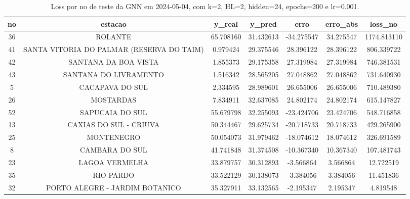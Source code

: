 \begin{table}[h]
\centering
\caption{Loss por no de teste da GNN em 2024-05-04, com k=2, HL=2, hidden=24, epochs=200 e lr=0.001.}
\label{tab:gnn_loss_k2_hl2_h24_e200_d20240504}
\begin{tabular}{ccccccc}
\toprule
no & estacao & y\_real & y\_pred & erro & erro\_abs & loss\_no \\
\midrule
36 & ROLANTE & 65.708160 & 31.432613 & -34.275547 & 34.275547 & 1174.813110 \\
41 & SANTA VITORIA DO PALMAR (RESERVA DO TAIM) & 0.979424 & 29.375546 & 28.396122 & 28.396122 & 806.339722 \\
42 & SANTANA DA BOA VISTA & 1.855373 & 29.175358 & 27.319984 & 27.319984 & 746.381531 \\
43 & SANTANA DO LIVRAMENTO & 1.516342 & 28.565205 & 27.048862 & 27.048862 & 731.640930 \\
5 & CACAPAVA DO SUL & 2.334595 & 28.989601 & 26.655006 & 26.655006 & 710.489380 \\
26 & MOSTARDAS & 7.834911 & 32.637085 & 24.802174 & 24.802174 & 615.147827 \\
52 & SAPUCAIA DO SUL & 55.679798 & 32.255093 & -23.424706 & 23.424706 & 548.716858 \\
13 & CAXIAS DO SUL - CRIUVA & 50.344467 & 29.625734 & -20.718733 & 20.718733 & 429.265900 \\
25 & MONTENEGRO & 50.054073 & 31.979462 & -18.074612 & 18.074612 & 326.691589 \\
8 & CAMBARA DO SUL & 41.741848 & 31.374508 & -10.367340 & 10.367340 & 107.481743 \\
23 & LAGOA VERMELHA & 33.879757 & 30.312893 & -3.566864 & 3.566864 & 12.722519 \\
35 & RIO PARDO & 33.522129 & 30.138073 & -3.384056 & 3.384056 & 11.451836 \\
32 & PORTO ALEGRE - JARDIM BOTANICO & 35.327911 & 33.132565 & -2.195347 & 2.195347 & 4.819548 \\
\bottomrule
\end{tabular}
\end{table}
